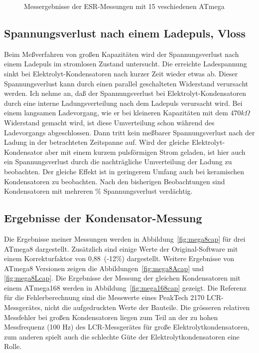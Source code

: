 \begin{figure}[H]
\centering

\caption{Messergebnisse der ESR-Messungen mit 15 veschiedenen ATmega}
\label{fig:Cesr}
\end{figure}

\subsection{Spannungsverlust nach einem Ladepuls, Vloss}
Beim Meßverfahren von großen Kapazitäten wird der Spannungsverlust nach einem Ladepuls im stromlosen Zustand untersucht.
Die erreichte Ladespannung sinkt bei Elektrolyt-Kondensatoren nach kurzer Zeit wieder etwas ab.
Dieser Spannungsverlust kann durch einen parallel geschalteten Widerstand verursacht werden.
Ich nehme an, daß der Spannungsverlust bei Elektrolyt-Kondensatoren durch eine interne Ladungsverteilung nach
dem Ladepuls verursacht wird. Bei einem langsamen Ladevorgang, wie er bei kleineren Kapazitäten mit dem \(470 k\Omega\) Widerstand
gemacht wird, ist diese Umverteilung schon während des Ladevorgangs abgeschlossen. Dann tritt kein meßbarer Spannungsverlust nach
der Ladung in der betrachteten Zeitspanne auf. Wird der gleiche Elektrolyt-Kondensator aber mit einem
kurzem pulsförmigen Strom geladen, ist hier auch ein Spannungsverlust durch die nachträgliche Umverteilung
der Ladung zu beobachten. Der gleiche Effekt ist in geringerem Umfang auch bei keramischen Kondensatoren zu beobachten. 
Nach den bisherigen Beobachtungen sind Kondensatoren mit mehreren \% Spannungsverlust verdächtig.

\subsection{Ergebnisse der Kondensator-Messung}
Die Ergebnisse meiner Messungen werden in Abbildung~\ref{fig:mega8cap} für drei ATmega8 dargestellt.
Zusätzlich sind einige Werte der Original-Software mit einem Korrekturfaktor
von 0,88~(-12\%) dargestellt.
Weitere Ergebnisse von ATmega8 Versionen zeigen die Abbildungen~\ref{fig:mega8Acap} und \ref{fig:mega8Lcap}.
Die Ergebnisse der Messung der gleichen Kondensatoren mit einem ATmega168 werden in Abbildung~\ref{fig:mega168cap} gezeigt.
Die Referenz für die Fehlerberechnung sind die Messwerte eines PeakTech 2170 LCR-Messgerätes, 
 nicht die aufgedruckten Werte der Bauteile.
Die grösseren relativen Messfehler bei großen Kondensatoren liegen zum Teil an der zu hohen Messfrequenz (100 Hz) des
LCR-Messgerätes für große Elektrolytkondensatoren, zum anderen spielt auch die schlechte Güte der
Elektrolytkondensatoren eine Rolle.

